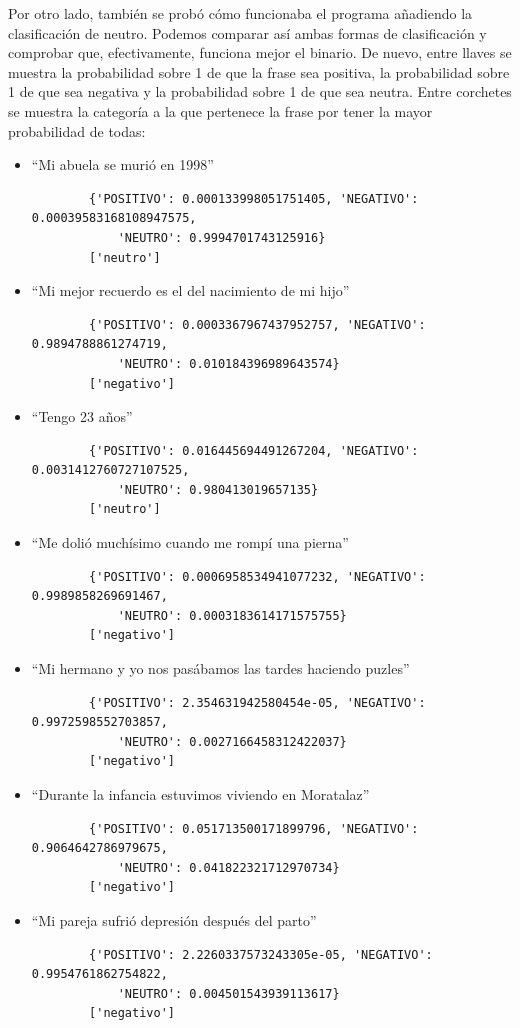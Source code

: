 Por otro lado, también se probó cómo funcionaba el programa añadiendo la clasificación de neutro. Podemos comparar así ambas formas de clasificación y comprobar que, efectivamente, funciona mejor el binario. De nuevo, entre llaves se muestra la probabilidad sobre 1 de que la frase sea positiva, la probabilidad sobre 1 de que sea negativa y la probabilidad sobre 1 de que sea neutra. Entre corchetes se muestra la categoría a la que pertenece la frase por tener la mayor probabilidad de todas:

\begin{itemize}
	\item ``Mi abuela se murió en 1998''
	\begin{verbatim}
		{'POSITIVO': 0.000133998051751405, 'NEGATIVO': 0.00039583168108947575,
			'NEUTRO': 0.9994701743125916}
		['neutro']
	\end{verbatim}
	\item ``Mi mejor recuerdo es el del nacimiento de mi hijo''
	\begin{verbatim}
		{'POSITIVO': 0.0003367967437952757, 'NEGATIVO': 0.9894788861274719, 
			'NEUTRO': 0.010184396989643574}
		['negativo']
	\end{verbatim}
	\item ``Tengo 23 años''
	\begin{verbatim}
		{'POSITIVO': 0.016445694491267204, 'NEGATIVO': 0.0031412760727107525, 
			'NEUTRO': 0.980413019657135}
		['neutro']
	\end{verbatim}
	\item ``Me dolió muchísimo cuando me rompí una pierna''
	\begin{verbatim}
		{'POSITIVO': 0.0006958534941077232, 'NEGATIVO': 0.9989858269691467, 
			'NEUTRO': 0.0003183614171575755}
		['negativo']
	\end{verbatim}
	\item ``Mi hermano y yo nos pasábamos las tardes haciendo puzles''
	\begin{verbatim}
		{'POSITIVO': 2.354631942580454e-05, 'NEGATIVO': 0.9972598552703857, 
			'NEUTRO': 0.0027166458312422037}
		['negativo']
	\end{verbatim}
	\item ``Durante la infancia estuvimos viviendo en Moratalaz''
	\begin{verbatim}
		{'POSITIVO': 0.051713500171899796, 'NEGATIVO': 0.9064642786979675, 
			'NEUTRO': 0.041822321712970734}
		['negativo']
	\end{verbatim}
	\item ``Mi pareja sufrió depresión después del parto''
	\begin{verbatim}
		{'POSITIVO': 2.2260337573243305e-05, 'NEGATIVO': 0.9954761862754822, 
			'NEUTRO': 0.004501543939113617}
		['negativo']
	\end{verbatim}
	
\end{itemize}

